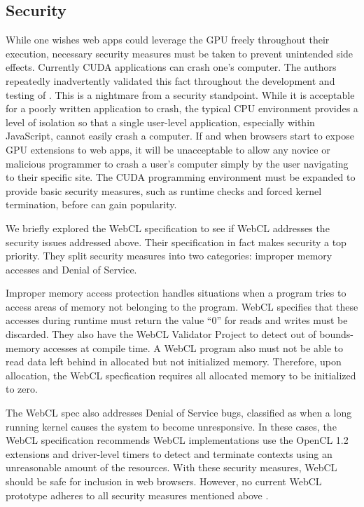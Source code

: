 \subsection{Security} \label{security} While one wishes web apps could leverage
the GPU freely throughout their execution, necessary security measures must be
taken to prevent unintended side effects. Currently CUDA applications can crash
one's computer.  The authors repeatedly inadvertently validated this fact
throughout the development and testing of \namens. This is a nightmare from a
security standpoint. While it is acceptable for a poorly written application to
crash, the typical CPU environment provides a level of isolation so that a
single user-level application, especially within JavaScript, cannot easily
crash a computer. If and when browsers start to expose GPU extensions to web
apps, it will be unacceptable to allow any novice or malicious programmer to
crash a user's computer simply by the user navigating to their specific site.
The CUDA programming environment must be expanded to provide basic security
measures, such as runtime checks and forced kernel termination, before \name
can gain popularity.

We briefly explored the WebCL specification to see if WebCL addresses the
security issues addressed above. Their specification in fact makes security a
top priority. They split security measures into two categories: improper memory
accesses and Denial of Service.

Improper memory access protection handles situations when a program tries to
access areas of memory not belonging to the program. WebCL specifies that these
accesses during runtime must return the value ``0'' for reads and writes must be
discarded. They also have the WebCL Validator Project \cite{webclValidator} to
detect out of bounds-memory accesses at compile time. A WebCL program also must
not be able to read data left behind in allocated but not initialized memory.
Therefore, upon allocation, the WebCL specfication requires all allocated memory
to be initialized to zero.

The WebCL spec also addresses Denial of Service bugs, classified as when a long
running kernel causes the system to become unresponsive. In these cases, the
WebCL specification recommends WebCL implementations use the OpenCL 1.2
extensions and driver-level timers to detect and terminate contexts using an
unreasonable amount of the resources.  With these security measures, WebCL
should be safe for inclusion in web browsers. However, no current WebCL
prototype adheres to all security measures mentioned above \cite{nokiasecurity}.

